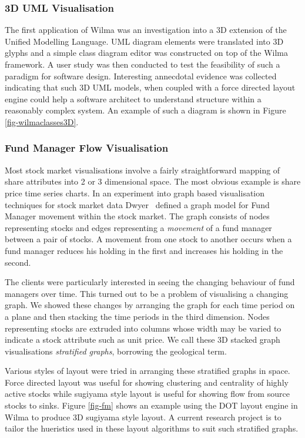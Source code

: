 \documentclass[runningheads]{cl2emult}
\begin{document}
\subsubsection{3D UML Visualisation} \label{sec:3duml}
The first application of Wilma was an investigation into a 3D
extension of the Unified Modelling Language\cite{dwyer013D-UML}.
UML diagram elements were translated into 3D glyphs and a simple class
diagram editor was constructed on top of the Wilma framework.  A user study
was then conducted to test the feasibility of such a paradigm for
software design.  Interesting annecdotal evidence was collected
indicating that such 3D UML models, when coupled with a force directed
layout engine could help a software architect to understand structure
within a reasonably complex system.  An example of such a diagram is
shown in Figure \ref{fig-wilmaclasses3D}.

\subsubsection{Fund Manager Flow Visualisation} \label{sec:fmflow}
Most stock market visualisations involve a fairly straightforward
mapping of share attributes into 2 or 3 dimensional space.  The most
obvious example is share price time series charts.  In an experiment
into graph based visualisation techniques for stock market data
Dwyer~\cite{dwyer02fmflow} defined a graph model for Fund Manager
movement within the stock market.  The graph consists of nodes
representing stocks and edges representing a {\em movement} of a
fund manager between a pair of stocks.  A movement from one stock to
another occurs when a fund manager reduces his holding in the first
and increases his holding in the second.

The clients were particularly interested in seeing the changing
behaviour of fund managers over time.  This turned out to be a problem
of visualising a changing graph.  We showed these changes by
arranging the graph for each time period on a plane and then stacking
the time periods in the third dimension.  Nodes representing stocks
are extruded into columns whose width may be varied to indicate a
stock attribute such as unit price.  We call these 3D stacked graph
visualisations {\em stratified graphs}, borrowing the geological term.

Various styles of layout were tried in arranging these stratified
graphs in space.  Force
directed layout was useful for showing clustering and centrality of
highly active stocks while sugiyama style layout is useful for showing
flow from source stocks to sinks.  Figure \ref{fig-fm} shows an
example using the DOT layout engine in Wilma to produce 3D sugiyama
style layout.  A current research project is to tailor the hueristics
used in these layout algorithms to suit such stratified graphs.
\end{document}
